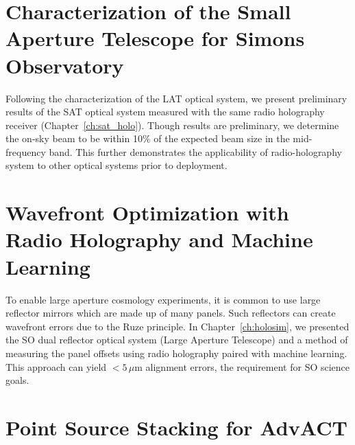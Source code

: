 \section{Characterization of the Small Aperture Telescope for Simons Observatory}
Following the characterization of the LAT optical system, we present preliminary results of the SAT optical system measured with the same radio holography receiver (Chapter~\ref{ch:sat_holo}).  Though results are preliminary, we determine the on-sky beam to be within 10\% of the expected beam size in the mid-frequency band.  This further demonstrates the applicability of radio-holography system to other optical systems prior to deployment.  

\section{Wavefront Optimization with Radio Holography and Machine Learning}

To enable large aperture cosmology experiments, it is common to use large reflector mirrors which are made up of many panels.  Such reflectors can create wavefront errors due to the Ruze principle.  In Chapter~\ref{ch:holosim}, we presented the SO dual reflector optical system (Large Aperture Telescope) and a method of measuring the panel offsets using radio holography paired with machine learning.  This approach can yield $<5\,\mu$m alignment errors, the requirement for SO science goals.

\section{Point Source Stacking for AdvACT}
